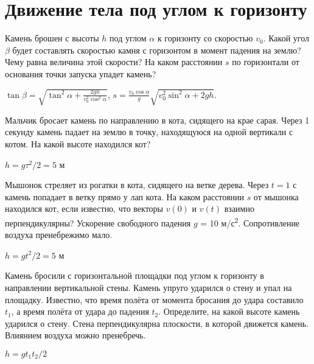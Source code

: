 \section{Движение тела под углом к горизонту}

\begin{ex} 
Камень брошен с высоты $h$ под углом $\alpha$ к горизонту  со скоростью $v_0$. Какой угол $\beta$ будет составлять скоростью камня с горизонтом в момент падения на землю? Чему равна величина этой скорости? На каком расстоянии $s$ по горизонтали от основания точки запуска упадет камень?
\begin{ans}
$\tan \beta = \sqrt{\tan^2 \alpha + \frac{2gh}{v_0^2 \cos^2 \alpha}}$, $s=\frac{v_0 \cos \alpha}{g} \sqrt{v_0^2 \sin^2 \alpha + 2gh}$.
\end{ans}
\end{ex}

\begin{ex}
Мальчик бросает камень по направлению в кота, сидящего на крае сарая. Через 1 секунду камень падает на землю в точку, находящуюся на одной вертикали с котом. На какой высоте находился кот?
\begin{ans}
$h = g\tau^2/2 = 5$ м		
\end{ans}
\end{ex}	

\begin{ex} 
Мышонок стреляет из рогатки в кота, сидящего на ветке дерева. Через $t = 1$ с камень попадает в ветку прямо у лап кота. На каком расстоянии $s$ от мышонка находился кот, если известно, что векторы $v(0)$ и $v(t)$ взаимно перпендикулярны? 
Ускорение свободного падения $g$ = 10 м/с\textsuperscript{2}. Сопротивление воздуха пренебрежимо мало.
\begin{ans}
$h = gt^2/2 = 5$ м
\end{ans}
\end{ex}

\begin{ex}
Камень бросили с горизонтальной площадки под углом к горизонту в направлении вертикальной стены. Камень упруго ударился о стену и упал на площадку. Известно, что время полёта от момента бросания до удара составило $t_1$, а время полёта от удара до падения $t_2$. Определите, на какой высоте камень ударился о стену. Стена перпендикулярна плоскости, в которой движется камень. Влиянием воздуха можно пренебречь.
\begin{ans}
$h = gt_1t_2/2$
\end{ans}
\end{ex}

